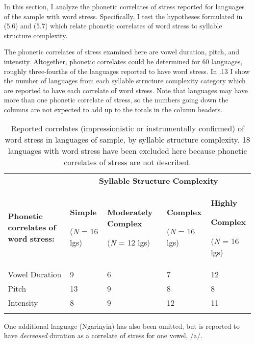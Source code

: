   In this section, I analyze the phonetic correlates of stress reported for languages of the sample with word stress. Specifically, I test the hypotheses formulated in (5.6) and (5.7) which relate phonetic correlates of word stress to syllable structure complexity.



  The phonetic correlates of stress examined here are vowel duration, pitch, and intensity. Altogether, phonetic correlates could be determined for 60 languages, roughly three-fourths of the languages reported to have word stress. In .13 I show the number of languages from each syllable structure complexity category which are reported to have each correlate of word stress. Note that languages may have more than one phonetic correlate of stress, so the numbers going down the columns are not expected to add up to the totals in the column headers.






\begin{table}
\begin{tabularx}{\textwidth}{XXXXX}
\lsptoprule
 & \multicolumn{4}{c}{ \textbf{Syllable} \textbf{Structure} \textbf{Complexity}}\\
 \textbf{Phonetic} \textbf{correlates} \textbf{of} \textbf{word} \textbf{stress:} & { \textbf{Simple}}

 (\textit{N} = 16 lgs) & { \textbf{Moderately} \textbf{Complex}}

 (\textit{N} = 12 lgs) & { \textbf{Complex}}

 (\textit{N} = 16 lgs) & { \textbf{Highly} }

{ \textbf{Complex}}

 (\textit{N} = 16 lgs)\\
 Vowel Duration & 9 & 6 & 7 & 12\\
 Pitch & 13 & 9 & 8 & 8\\
 Intensity & 8 & 9 & 12 & 11\\
\lspbottomrule
\end{tabularx}
\caption{\label{5.13}Reported correlates (impressionistic or instrumentally confirmed) of word stress in languages of sample, by syllable structure complexity. 18 languages with word stress have been excluded here because phonetic correlates of stress are not described.}One additional language (Ngarinyin) has also been omitted, but is reported to have \textit{decreased} duration as a correlate of stress for one vowel, /a/.
\end{table}




